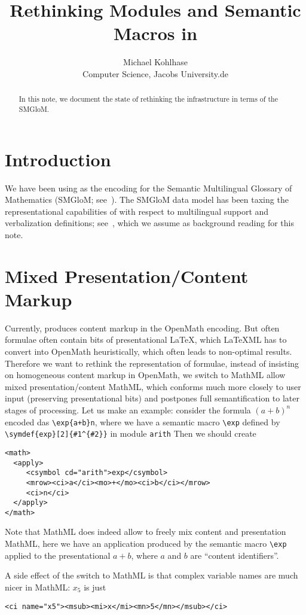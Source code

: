 \documentclass{bluenote}
\title{Rethinking Modules and Semantic Macros in \protect\sTeX}
\author{Michael Kohlhase\\Computer Science, Jacobs University.de}
\def\smglom{\textsf{SMGloM}\xspace}
\def\latexml{{\LaTeX}ML\xspace}
\begin{document}
\maketitle
\begin{abstract}
  In this note, we document the state of rethinking the \sTeX infrastructure in terms of
  the \smglom.
\end{abstract}
\section{Introduction}
We have been using \sTeX as the encoding for the Semantic Multilingual Glossary of
Mathematics (\smglom; see~\cite{IanJucKoh:sps14}). The \smglom data model has been taxing
the representational capabilities of \sTeX with respect to multilingual support and
verbalization definitions; see~\cite {Kohlhase:dmesmgm14}, which we assume as background
reading for this note.

\section{Mixed Presentation/Content Markup}
Currently, \sTeX produces content markup in the OpenMath encoding. But often \sTeX
formulae often contain bits of presentational {\LaTeX}, which \latexml has to convert into
OpenMath heuristically, which often leads to non-optimal results. Therefore we want to
rethink the representation of formulae, instead of insisting on homogeneous content markup
in OpenMath, we switch to MathML allow mixed presentation/content MathML, which conforms
much more closely to user input (preserving presentational bits) and postpones full
semantification to later stages of processing. Let us make an example: consider the
formula $(a+b)^n$ encoded das \lstinline|\exp{a+b}n|, where we have a semantic macro
\lstinline|\exp| defined by \lstinline|\symdef{exp}[2]{#1^{#2}}| in module
\lstinline|arith| Then we should create
\begin{lstlisting}[language=MathML]
<math>
  <apply>
     <csymbol cd="arith">exp</csymbol>
     <mrow><ci>a</ci><mo>+</mo><ci>b</ci></mrow>
     <ci>n</ci>
  </apply>
</math>
\end{lstlisting}
Note that MathML does indeed allow to freely mix content and presentation MathML, here we
have an application produced by the semantic macro \lstinline|\exp| applied to the
presentational $a+b$, where $a$ and $b$ are ``content identifiers''. 

A side effect of the switch to MathML is that complex variable names are much nicer in
MathML: $x_5$ is just 
\begin{lstlisting}[language=MathML]
<ci name="x5"><msub><mi>x</mi><mn>5</mn></msub></ci>
\end{lstlisting}
\end{document}
